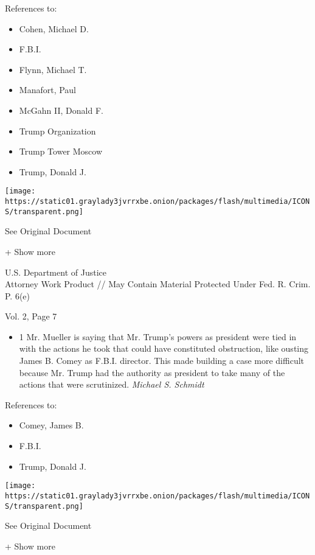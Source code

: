 References to:

\begin{itemize}
\tightlist
\item
  Cohen, Michael D.
\item
  F.B.I.
\item
  Flynn, Michael T.
\item
  Manafort, Paul 
\item
  McGahn II, Donald F.
\item
  Trump Organization
\item
  Trump Tower Moscow
\item
  Trump, Donald J.
\end{itemize}

\protect\hyperlink{}{}

\texttt{[image: https://static01.graylady3jvrrxbe.onion/packages/flash/multimedia/ICONS/transparent.png]}

See Original Document

+ Show more

U.S. Department of Justice\\
Attorney Work Product // May Contain Material Protected Under Fed. R.
Crim. P. 6(e)

Vol. 2, Page 7

\begin{itemize}
\tightlist
\item
  1 Mr. Mueller is saying that Mr. Trump's powers as president were tied
  in with the actions he took that could have constituted obstruction,
  like ousting James B. Comey as F.B.I. director. This made building a
  case more difficult because Mr. Trump had the authority as president
  to take many of the actions that were scrutinized. \emph{Michael S.
  Schmidt}
\end{itemize}

References to:

\begin{itemize}
\tightlist
\item
  Comey, James B.
\item
  F.B.I.
\item
  Trump, Donald J.
\end{itemize}

\protect\hyperlink{}{}

\texttt{[image: https://static01.graylady3jvrrxbe.onion/packages/flash/multimedia/ICONS/transparent.png]}

See Original Document

+ Show more


